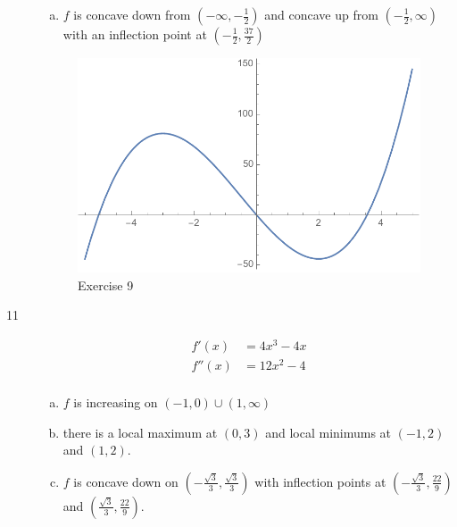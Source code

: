 \documentclass[letterpaper]{exam}
\begin{document}
\begin{description}
\begin{enumerate}[(a)]
        \item $f$ is concave down from $\left( -\infty, - \frac{1}{2} \right)$ and 
          concave up from $\left( - \frac{1}{2}, \infty \right)$ with an
          inflection point at $\left( -\frac{1}{2}, \frac{37}{2} \right)$
      \end{enumerate}

      \begin{figure}[H]
        \centering
        \includegraphics[scale = 0.6]{ex09.pdf}
        \caption{Exercise 9}
        \label{fig:ex09}
      \end{figure}
      
    \newpage

    \item[11]
      \begin{align*}
        f'(x)  & = 4x^3 - 4x \\
        f''(x) & = 12x^2 - 4 \\
      \end{align*}

      \begin{enumerate}[(a)]
        \item $f$ is increasing on $(-1, 0) \cup (1, \infty)$

        \item there is a local maximum at $(0, 3)$ and local minimums at
          $(-1, 2)$ and $(1, 2)$.

        \item $f$ is concave down on $\left( -\frac{\sqrt{3}}{3}, \frac{\sqrt{3}}{3} \right)$ with
          inflection points at $\left( -\frac{\sqrt{3}}{3}, \frac{22}{9} \right)$ and
          $\left( \frac{\sqrt{3}}{3}, \frac{22}{9} \right)$.

      \end{enumerate}


\end{description}
\end{document}
